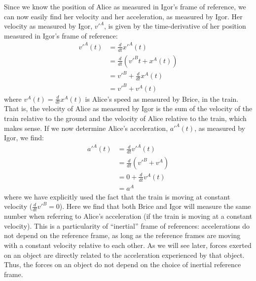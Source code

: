 Since we know the position of Alice as measured in Igor's frame of reference, we can now easily find her velocity and her acceleration, as measured by Igor. Her velocity as measured by Igor, $v'^A$, is given by the time-derivative of her position measured in Igor's frame of reference:
\begin{align}
v'^A(t)&=\frac{d}{dt}x'^A(t)\\
&=\frac{d}{dt}(v'^Bt+x^A(t))\\
&=v'^B+\frac{d}{dt}x^A(t)\\
&=v'^B+v^A(t)
\end{align}
where $v^A(t)=\frac{d}{dt}x^A(t)$ is Alice's speed as measured by Brice, in the train. That is, the velocity of Alice as measured by Igor is the sum of the velocity of the train relative to the ground and the velocity of Alice relative to the train, which makes sense. If we now determine Alice's acceleration, $a'^A(t)$, as measured by Igor, we find:
\begin{align}
a'^A(t)&=\frac{d}{dt}v'^A(t)\\
&=\frac{d}{dt}(v'^B+v^A)\\
&=0+\frac{d}{dt}v^A(t)\\
&=a^A
\end{align}
where we have explicitly used the fact that the train is moving at constant velocity ($\frac{d}{dt}v'^B=0$). Here we find that both Brice and Igor will measure the same number when referring to Alice's acceleration (if the train is moving at a constant velocity). This is a particularity of ``inertial'' frame of references: accelerations do not depend on the reference frame, as long as the reference frames are moving with a constant velocity relative to each other. As we will see later, forces exerted on an object are directly related to the acceleration experienced by that object. Thus, the forces on an object do not depend on the choice of inertial reference frame. \\
\vspace{-0.65cm}
